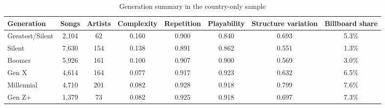\begin{landscape}
\begin{table}[H]
\centering
\caption{Generation summary in the country-only sample}
\label{tab:generation}
\begin{tabular}{lccccccc}
\toprule
Generation & Songs & Artists & Complexity & Repetition & Playability & Structure variation & Billboard share \\
\midrule
Greatest/Silent & 2,104 & 62 & 0.160 & 0.900 & 0.840 & 0.693 & 5.3\% \\
Silent & 7,630 & 154 & 0.138 & 0.891 & 0.862 & 0.551 & 1.3\% \\
Boomer & 5,926 & 161 & 0.100 & 0.907 & 0.900 & 0.569 & 3.0\% \\
Gen X & 4,614 & 164 & 0.077 & 0.917 & 0.923 & 0.632 & 6.5\% \\
Millennial & 4,710 & 201 & 0.082 & 0.928 & 0.918 & 0.799 & 7.6\% \\
Gen Z+ & 1,379 & 73 & 0.082 & 0.925 & 0.918 & 0.697 & 7.3\% \\
\bottomrule
\end{tabular}
\end{table}
\end{landscape}

